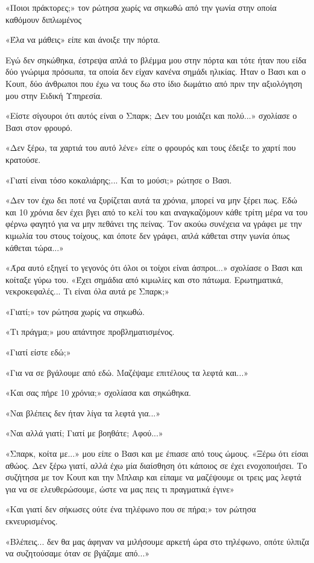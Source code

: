 \documentclass[12pt,twoside, openany]{book}
\begin{document}
«Ποιοι πράκτορες;» τον ρώτησα χωρίς να σηκωθώ από την γωνία στην οποία καθόμουν διπλωμένος

«Έλα να μάθεις» είπε και άνοιξε την πόρτα.

Εγώ δεν σηκώθηκα, έστρεψα απλά το βλέμμα μου στην πόρτα και τότε ήταν που είδα δύο γνώριμα πρόσωπα, τα οποία δεν είχαν κανένα σημάδι ηλικίας. Ήταν ο Βασι και ο Κουπ, δύο άνθρωποι που έχω να τους δω στο ίδιο δωμάτιο από πριν την αξιολόγηση μου στην Ειδική Υπηρεσία.

«Είστε σίγουροι ότι αυτός είναι ο Σπαρκ; Δεν του μοιάζει και πολύ...» σχολίασε ο Βασι στον φρουρό.

«Δεν ξέρω, τα χαρτιά του αυτό λένε» είπε ο φρουρός και τους έδειξε το χαρτί που κρατούσε.

«Γιατί είναι τόσο κοκαλιάρης;... Και το μούσι;» ρώτησε ο Βασι.

«Δεν τον έχω δει ποτέ να ξυρίζεται αυτά τα χρόνια, μπορεί να μην ξέρει πως. Εδώ και 10 χρόνια δεν έχει βγει από το κελί του και αναγκαζόμουν κάθε τρίτη μέρα να του φέρνω φαγητό για να μην πεθάνει της πείνας. Τον ακούω συνέχεια να γράφει με την κιμωλία του στους τοίχους, και όποτε δεν γράφει, απλά κάθεται στην γωνία όπως κάθεται τώρα...»

«Άρα αυτό εξηγεί το γεγονός ότι όλοι οι τοίχοι είναι άσπροι...» σχολίασε ο Βασι και κοίταξε γύρω του. «Έχει σημάδια από κιμωλίες και στο πάτωμα. Ερωτηματικά, νεκροκεφαλές... Τι είναι όλα αυτά ρε Σπαρκ;»

«Γιατί;» τον ρώτησα χωρίς να σηκωθώ.

«Τι πράγμα;» μου απάντησε προβληματισμένος.

«Γιατί είστε εδώ;»

«Για να σε βγάλουμε από εδώ. Μαζέψαμε επιτέλους τα λεφτά και...»

«Και σας πήρε 10 χρόνια;» σχολίασα και σηκώθηκα.

«Ναι βλέπεις δεν ήταν λίγα τα λεφτά για...»

«Ναι αλλά γιατί; Γιατί με βοηθάτε; Αφού...»

«Σπαρκ, κοίτα με...» μου είπε ο Βασι και με έπιασε από τους ώμους. «Ξέρω ότι είσαι αθώος. Δεν ξέρω γιατί, αλλά έχω μία διαίσθηση ότι κάποιος σε έχει ενοχοποιήσει. Το συζήτησα με τον Κουπ και την Μπλαιρ και είπαμε να μαζέψουμε οι τρεις μας λεφτά για να σε ελευθερώσουμε, ώστε να μας πεις τι πραγματικά έγινε»

«Και γιατί δεν σήκωσες ούτε ένα τηλέφωνο που σε πήρα;» τον ρώτησα εκνευρισμένος.

«Βλέπεις... δεν θα μας άφηναν να μιλήσουμε αρκετή ώρα στο τηλέφωνο, οπότε ύλπιζα να συζητούσαμε όταν σε βγάζαμε από...»
\end{document}
